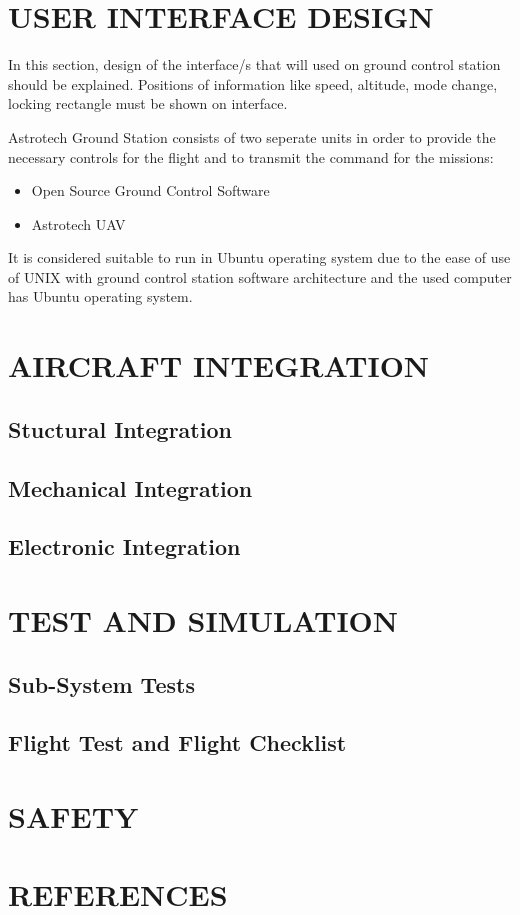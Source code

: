 \documentclass[12pt]{article}
\begin{document}
\section{USER INTERFACE DESIGN}
In this section, design of the interface/s that will used on ground control station should be explained. Positions of information like speed, altitude, mode change, locking rectangle must be shown on interface.

Astrotech Ground Station consists of two seperate units in order to provide the necessary controls for the flight and to transmit the command for the missions:

\begin{itemize}
	\item Open Source Ground Control Software
	\item Astrotech UAV
\end{itemize}

It is considered suitable to run in Ubuntu operating system due to the ease of use of UNIX with ground control station software architecture and the used computer has Ubuntu operating system.


\section{AIRCRAFT INTEGRATION}
\subsection{Stuctural Integration}
\subsection{Mechanical Integration}
\subsection{Electronic Integration}

\section{TEST AND SIMULATION}
\subsection{Sub-System Tests}
\subsection{Flight Test and Flight Checklist}

\section{SAFETY}

\section{REFERENCES}

\singlespacing
 

\end{document}
